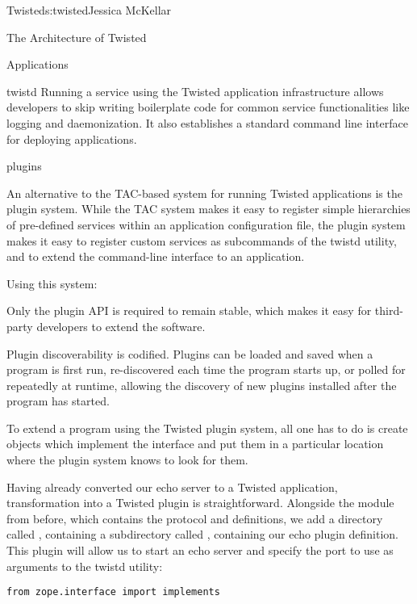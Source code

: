 \begin{aosachapter}{Twisted}{s:twisted}{Jessica McKellar}
\begin{aosasect1}{The Architecture of Twisted}
\begin{aosasect2}{Applications}
\begin{aosasect3}{twistd}
Running a service using the Twisted application infrastructure allows
developers to skip writing boilerplate code for common service functionalities
like logging and daemonization. It also establishes a standard command line
interface for deploying applications.

\end{aosasect3}

\begin{aosasect3}{plugins}

An alternative to the TAC-based system for running Twisted applications is
the plugin system. While the TAC system makes it easy to register simple
hierarchies of pre-defined services within an application configuration file,
the plugin system makes it easy to register custom services as subcommands of
the twistd utility, and to extend the command-line interface to an
application.

Using this system:

\begin{aosaenumerate}

\item Only the plugin API is required to remain stable, which makes it
  easy for third-party developers to extend the software.

\item Plugin discoverability is codified. Plugins can be loaded and
  saved when a program is first run, re-discovered each time the
  program starts up, or polled for repeatedly at runtime, allowing the
  discovery of new plugins installed after the program has started.

\end{aosaenumerate}

To extend a program using the Twisted plugin system, all one has to do is
create objects which implement the  interface and put them
in a particular location where the plugin system knows to look for them.

Having already converted our echo server to a Twisted application,
transformation into a Twisted plugin is straightforward. Alongside the
 module from before, which contains the 
protocol and  definitions, we add a directory called
, containing a subdirectory called ,
containing our echo plugin definition. This plugin will allow us to start an
echo server and specify the port to use as arguments to the twistd utility:

\begin{verbatim}
from zope.interface import implements


\end{verbatim}
\end{aosasect3}
\end{aosasect2}
\end{aosasect1}
\end{aosachapter}
